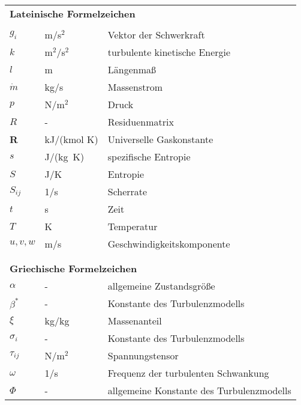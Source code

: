 \begin{longtable}{p{} p{} p{}}  %
\multicolumn{3}{l}{%
\textbf{\textsf{\large Lateinische Formelzeichen}}
}\\
%
&&\\
$g_i$                     & {m/s$^2$}       & Vektor der Schwerkraft    \\
$k$                       & {m$^2$/s$^2$}   & turbulente kinetische Energie \\
$l$                       &   m                & Längenmaß \\
$\dot m$                  &   kg/s             & Massenstrom \\
$p$                       &   N/m$^2$          & Druck \\
$R$                      &   -                 &  Residuenmatrix   \\
{\textbf{R}}             & kJ/(kmol K)         & Universelle Gaskonstante \\
$s$ 										& 	{J/(kg~K)}         & spezifische Entropie \\
$ S $                    & J/K                 & Entropie \\
$S_{ij}$                 &   1/s               &  Scherrate   \\
$t$                       &   s                & Zeit \\
$ T $                    & K                   & Temperatur \\
$u,v,w$                   &   m/s              & Geschwindigkeitskomponente \\
                      & & \\ %

\\
\multicolumn{3}{l}{%
\textbf{\textsf{\large Griechische Formelzeichen}}
 }\\
$\alpha$                &    -                & allgemeine Zustandsgröße \\
$\beta^*$               &    -                & Konstante des Turbulenzmodells \\
$\xi$                   &    kg/kg            & Massenanteil\\
$\sigma_i$              &    -                & Konstante des Turbulenzmodells \\
$\tau_{ij}$             &    N/m$^2$          & Spannungstensor   \\
$\omega$                &    1/s              & Frequenz der turbulenten Schwankung   \\
$\Phi$                  &    -                & allgemeine Konstante des Turbulenzmodells   \\


\end{longtable}
